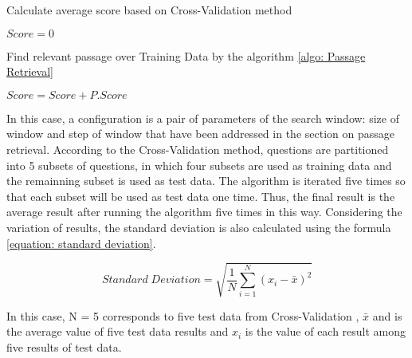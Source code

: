  \begin{algorithm}
\caption{Calculate average score based on Cross-Validation method}
\label{alg: Cross-Validation}
\begin{algorithmic}
\STATE $Score = 0$

\STATE Find relevant passage over Training Data by the algorithm \ref{algo: Passage Retrieval}
			
			
\ENDFOR
\ENDFOR

\STATE $Score = Score + P.Score$
		
\ENDFOR
	

\end{algorithmic}
\end{algorithm}

In this case, a configuration is a pair of parameters of the search window: size of window and step of window that have been addressed in the section on passage retrieval. According to the Cross-Validation method, questions are partitioned into 5 subsets of questions, in which four subsets are used as training data and the remainning subset is used as test data. The algorithm is iterated five times so that each subset will be used as test data one time. Thus, the final result is the average result after running the algorithm five times in this way. Considering the variation of results, the standard deviation is also calculated using the formula \ref{equation: standard deviation}. 

\begin{equation}
\label{equation: standard deviation}
	Standard \; Deviation = \sqrt{\dfrac{1}{N} \sum_{i=1}^N (x_i -\bar{x} )^2 }
\end{equation}


In this case, N = 5 corresponds to five test data from Cross-Validation , \ensuremath{\bar{x}} and is the average value of five test data results and \ensuremath{x_i} is the value of each result among five results of test data.

